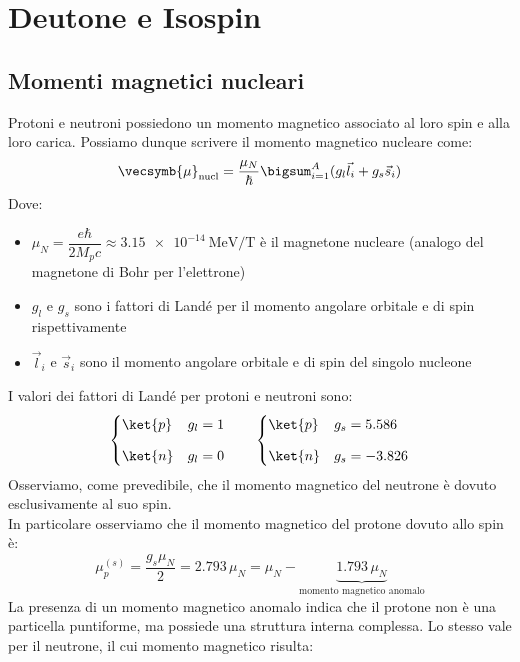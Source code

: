 \chapter[Particelle elementari]{Deutone e Isospin}
\section{Momenti magnetici nucleari}
Protoni e neutroni possiedono un momento magnetico associato al loro spin e alla loro carica. Possiamo dunque scrivere il momento magnetico nucleare come:
\begin{equation}
 \vecsymb{\mu}_{\text{nucl}} = \dfrac{\mu_N}{\hbar} \bigsum_{i=1}^A (g_l \vec{l}_i + g_s \vec{s}_i)
\end{equation}
Dove:
\begin{itemize}
 \item $\mu_N = \dfrac{e \hbar}{2 M_p c} \approx \qty{3.15e-14}{\mega\electronvolt\per\tesla}$ è il magnetone nucleare (analogo del magnetone di Bohr per l'elettrone)
 \item $g_l$ e $g_s$ sono i fattori di Landé per il momento angolare orbitale e di spin rispettivamente
 \item $\vec{l}_i$ e $\vec{s}_i$ sono il momento angolare orbitale e di spin del singolo nucleone
\end{itemize}
I valori dei fattori di Landé per protoni e neutroni sono:
\begin{equation}
  \begin{cases}
    \ket{p} & g_l = 1\\[8pt]
    \ket{n} & g_l = 0
  \end{cases} \qquad
  \begin{cases}
    \ket{p} & g_s = 5.586 \\[8pt]
    \ket{n} & g_s = -3.826
  \end{cases}
\end{equation}
Osserviamo, come prevedibile, che il momento magnetico del neutrone è dovuto esclusivamente al suo spin.\\
In particolare osserviamo che il momento magnetico del protone dovuto allo spin è:
\begin{equation}
 \mu_{p}^{(s)} = \dfrac{g_s \mu_N}{2} = 2.793\, \mu_N = \mu_N - \underbrace{1.793\,\mu_N}_{\text{momento magnetico anomalo}}
\end{equation}
La presenza di un momento magnetico anomalo indica che il protone non è una particella puntiforme, ma possiede una struttura interna complessa. Lo stesso vale per il neutrone, il cui momento magnetico risulta:
